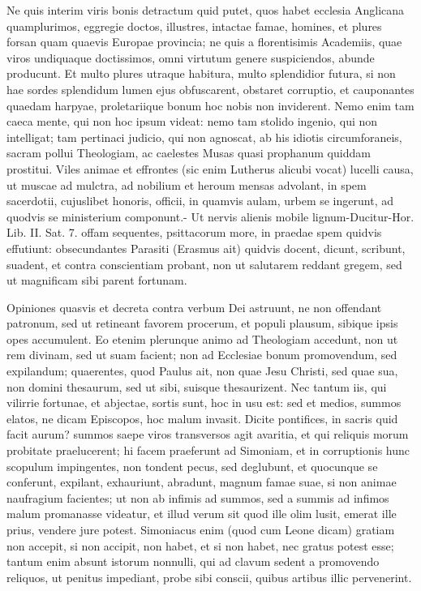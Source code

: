 {{Ne quis interim viris bonis detractum quid putet, quos habet ecclesia Anglicana quamplurimos,
eggregie doctos, illustres, intactae famae, homines, et plures forsan
quam quaevis Europae provincia; ne quis a florentisimis Academiis, quae
viros undiquaque doctissimos, omni virtutum genere suspiciendos, abunde
producunt. Et multo plures utraque habitura, multo splendidior futura,
si non hae sordes splendidum lumen ejus obfuscarent, obstaret
corruptio, et cauponantes quaedam harpyae, proletariique bonum hoc
nobis non inviderent. Nemo enim tam caeca mente, qui non hoc ipsum
videat: nemo tam stolido ingenio, qui non intelligat; tam pertinaci
judicio, qui non agnoscat, ab his idiotis circumforaneis, sacram pollui
Theologiam, ac caelestes Musas quasi prophanum quiddam prostitui. Viles
animae et effrontes (sic enim Lutherus  alicubi vocat) lucelli
causa, ut muscae ad mulctra, ad nobilium et heroum mensas advolant, in
spem sacerdotii, cujuslibet honoris, officii, in quamvis aulam, urbem
se ingerunt, ad quodvis se ministerium componunt.- Ut nervis alienis
mobile lignum-Ducitur-Hor. Lib. II. Sat. 7.  offam sequentes,
psittacorum more, in praedae spem quidvis effutiunt: obsecundantes
Parasiti (Erasmus ait) quidvis docent, dicunt, scribunt, suadent,
et contra conscientiam probant, non ut salutarem reddant gregem, sed ut
magnificam sibi parent fortunam.

Opiniones quasvis et decreta contra verbum Dei astruunt, ne non offendant patronum, sed ut retineant
favorem procerum, et populi plausum, sibique ipsis opes accumulent. Eo
etenim plerunque animo ad Theologiam accedunt, non ut rem divinam, sed
ut suam facient; non ad Ecclesiae bonum promovendum, sed expilandum;
quaerentes, quod Paulus ait, non quae Jesu Christi, sed quae sua, non
domini thesaurum, sed ut sibi, suisque thesaurizent. Nec tantum iis,
qui vilirrie fortunae, et abjectae, sortis sunt, hoc in usu est: sed et
medios, summos elatos, ne dicam Episcopos, hoc malum invasit. 
Dicite pontifices, in sacris quid facit aurum? summos saepe viros
transversos agit avaritia, et qui reliquis morum probitate
praelucerent; hi facem praeferunt ad Simoniam, et in corruptionis hunc
scopulum impingentes, non tondent pecus, sed deglubunt, et quocunque se
conferunt, expilant, exhauriunt, abradunt, magnum famae suae, si non
animae naufragium facientes; ut non ab infimis ad summos, sed a summis
ad infimos malum promanasse videatur, et illud verum sit quod ille olim
lusit, emerat ille prius, vendere jure potest. Simoniacus enim (quod
cum Leone dicam) gratiam non accepit, si non accipit, non habet, et si
non habet, nec gratus potest esse; tantum enim absunt istorum nonnulli,
qui ad clavum sedent a promovendo reliquos, ut penitus impediant, probe
sibi conscii, quibus artibus illic pervenerint.

}}
